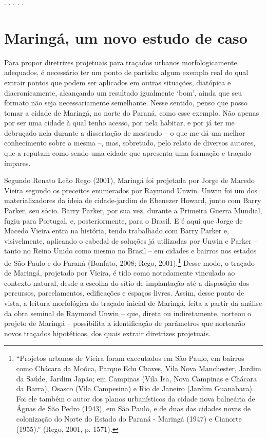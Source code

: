 \documentclass[12pt, a4paper]{book} %
\begin{document}
        \begin{center}
            . . . . .
        \end{center} 

        \chapter[Maringá, um novo estudo de caso]{Maringá, um novo estudo de caso}

        Para propor diretrizes projetuais para traçados urbanos morfologicamente adequados, é necessário ter um ponto de partida: algum exemplo real do qual extrair pontos que podem ser aplicados em outras situações, diatópica e diacronicamente, alcançando um resultado igualmente `bom', ainda que seu formato não seja necessariamente semelhante. Nesse sentido, penso que posso tomar a cidade de Maringá, no norte do Paraná, como esse exemplo. Não apenas por ser uma cidade à qual tenho acesso, por nela habitar, e por já ter me debruçado nela durante a dissertação de mestrado – o que me dá um melhor conhecimento sobre a mesma –, mas, sobretudo, pelo relato de diversos autores, que a reputam como sendo uma cidade que apresenta uma formação e traçado ímpares.

        Segundo Renato Leão Rego (2001), Maringá foi projetada por Jorge de Macedo Vieira segundo os preceitos enumerados por Raymond Unwin. Unwin foi um dos materializadores da ideia de cidade-jardim de Ebenezer Howard, junto com Barry Parker, seu sócio. Barry Parker, por sua vez, durante a Primeira Guerra Mundial, fugiu para Portugal, e, posteriormente, para o Brasil. E é aqui que Jorge de Macedo Vieira entra na história, tendo trabalhado com Barry Parker e, visivelmente, aplicando o cabedal de soluções já utilizadas por Unwin e Parker – tanto no Reino Unido como mesmo no Brasil – em cidades e bairros nos estados de São Paulo e do Paraná (Bonfato, 2008; Rego, 2001).\footnote[0]{``Projetos urbanos de Vieira foram executados em São Paulo, em bairros como Chácara da Moóca, Parque Edu Chaves, Vila Nova Manchester, Jardim 
        da Saúde, Jardim Japão; em Campinas (Vila Isa, 
        Nova Campinas e Chácara da Barra), Osasco (Vila 
        Campesina) e Rio de Janeiro (Jardim Guanabara). 
        Foi ele também o autor dos planos urbanísticos da 
        cidade nova balneária de Águas de São Pedro (1943), 
        em São Paulo, e de duas das cidades novas de 
        colonização do Norte do Estado do Paraná - 
        Maringá (1947) e Cianorte (1955).'' (Rego, 2001, p. 1571).} Desse modo, o traçado de Maringá, projetado por Vieira, é tido como notadamente vinculado ao contexto natural, desde a escolha do sítio de implantação até a disposição dos percursos, parcelamentos, edificações e espaços livres. Assim, desse ponto de vista, a leitura morfológica do traçado inicial de Maringá, feita a partir da análise da obra seminal de Raymond Unwin – que, direta ou indiretamente, norteou o projeto de Maringá – possibilita a identificação de parâmetros que nortearão novos traçados hipotéticos, dos quais extrair diretrizes projetuais.
\end{document}
